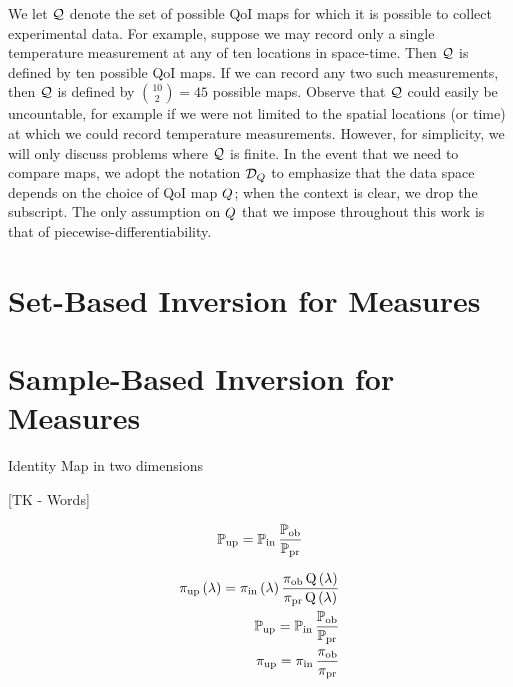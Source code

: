 We let $\mathcal{Q}$ denote the set of possible QoI maps for which it is possible to collect experimental data.
For example, suppose we may record only a single temperature measurement at any of ten locations in space-time.
Then $\mathcal{Q}$ is defined by ten possible QoI maps.
If we can record any two such measurements, then $\mathcal{Q}$ is defined by $\binom{10}{2} = 45$ possible maps.
Observe that $\mathcal{Q}$ could easily be uncountable, for example if we were not limited to the spatial locations (or time) at which we could record temperature measurements.
However, for simplicity, we will only discuss problems where $\mathcal{Q}$ is finite.
In the event that we need to compare maps, we adopt the notation $\mathcal{D}_{Q}$ to emphasize that the data space depends on the choice of QoI map $Q$; when the context is clear, we drop the subscript.
The only assumption on $Q$ that we impose throughout this work is that of piecewise-differentiability.


\pagebreak
\section{Set-Based Inversion for Measures}\label{sec:ch02-set}






\pagebreak
\section{Sample-Based Inversion for Measures}\label{sec:ch02-sample}




Identity Map in two dimensions


[TK - Words]

\begin{equation}
\operatorname*{\mathbb{P}_{up}} = \operatorname*{\mathbb{P}_{in}} \frac{\operatorname*{\mathbb{P}_{ob}}}{\operatorname*{\mathbb{P}_{pr}}}
\end{equation}

\begin{equation}
\begin{split}
\operatorname*{\operatorname*{\pi_{up}}\left ( \lambda \right ) = \operatorname*{\pi_{in}}\left ( \lambda \right ) \frac{\operatorname*{\pi_{ob}}Q\left ( \lambda \right )}{\operatorname*{\pi_{pr}}Q\left ( \lambda \right )}}\\
\operatorname*{\operatorname*{\mathbb{P}_{up}} = \operatorname*{\mathbb{P}_{in}} \frac{\operatorname*{\mathbb{P}_{ob}}}{\operatorname*{\mathbb{P}_{pr}}}}\\
\operatorname*{\operatorname*{\pi_{up}} = \operatorname*{\pi_{in}} \frac{\operatorname*{\pi_{ob}}}{\operatorname*{\pi_{pr}}}}
\end{split}
\end{equation}

